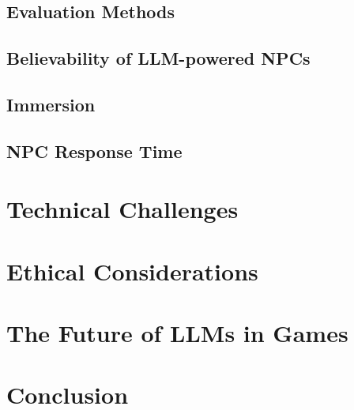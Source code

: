 \documentclass[10pt,twocolumn]{article}
\begin{document}
\subsection{Evaluation Methods}

\subsection{Believability of LLM-powered NPCs}

\subsection{Immersion}

\subsection{NPC Response Time}

\section{Technical Challenges}

\section{Ethical Considerations}

\section{The Future of LLMs in Games}

\section{Conclusion}

\printbibliography
\end{document}
